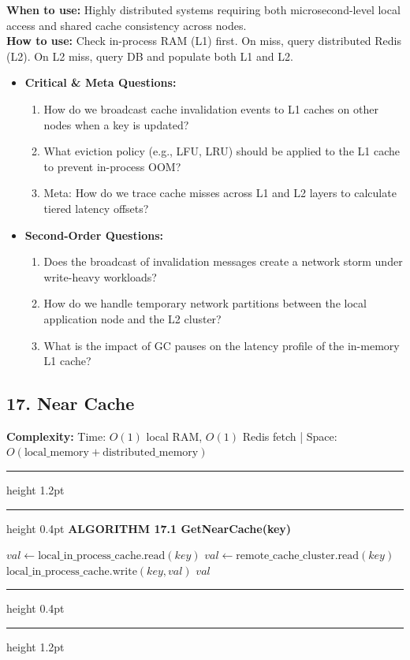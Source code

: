 \documentclass[11pt,a4paper]{article}
\newenvironment{textbookalgo}[2]{%
  \par\addvspace{1.2em}\noindent
  \hrule height 1.2pt
  \vspace{1.5pt}
  \hrule height 0.4pt
  \vspace{5pt}
  {\noindent\large\bfseries\sffamily ALGORITHM #1 \quad #2}
  \par\vspace{5pt}
  \RestyleAlgo{plain}
}{%
  \par\vspace{4pt}
  \hrule height 0.4pt
  \vspace{1.5pt}
  \hrule height 1.2pt
  \par\addvspace{1.2em}
}
\theoremstyle{definition}
\begin{document}
\noindent
\textbf{When to use:} Highly distributed systems requiring both microsecond-level local access and shared cache consistency across nodes.\\
\textbf{How to use:} Check in-process RAM (L1) first. On miss, query distributed Redis (L2). On L2 miss, query DB and populate both L1 and L2.
\begin{itemize}[leftmargin=*]
  \item[] \textbf{Critical \& Meta Questions:}
  \begin{enumerate}
  \item How do we broadcast cache invalidation events to L1 caches on other nodes when a key is updated?
  \item What eviction policy (e.g., LFU, LRU) should be applied to the L1 cache to prevent in-process OOM?
  \item Meta: How do we trace cache misses across L1 and L2 layers to calculate tiered latency offsets?
  \end{enumerate}
  \item[] \textbf{Second-Order Questions:}
  \begin{enumerate}
  \item Does the broadcast of invalidation messages create a network storm under write-heavy workloads?
  \item How do we handle temporary network partitions between the local application node and the L2 cluster?
  \item What is the impact of GC pauses on the latency profile of the in-memory L1 cache?
  \end{enumerate}
\end{itemize}
\medskip

\clearpage
\subsection{17. Near Cache}

\noindent
\textbf{Complexity:} Time: $O(1)$ local RAM, $O(1)$ Redis fetch | Space: $O(\text{local\_memory} + \text{distributed\_memory})$
\smallskip

\begin{textbookalgo}{17.1}{GetNearCache(key)}
\begin{algorithm}[H]
$val \leftarrow \text{local\_in\_process\_cache.read}(key)$\;
$val \leftarrow \text{remote\_cache\_cluster.read}(key)$\;
$\text{local\_in\_process\_cache.write}(key, val)$\;
\Return $val$\;
\end{algorithm}
\end{textbookalgo}
\end{document}

